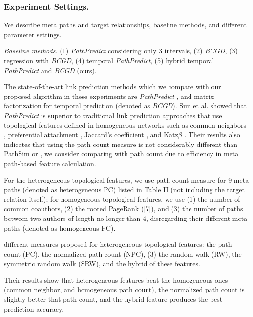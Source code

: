 \subsubsection{Experiment Settings.} We describe meta paths and target relationships, baseline methods, and different parameter settings.

\textit{Baseline methods.} (1) \textit{PathPredict} considering only 3 intervals, (2) \textit{BCGD}, (3) regression with \textit{BCGD}, (4) temporal \textit{PathPredict}, (5) hybrid temporal \textit{PathPredict} and \textit{BCGD} (ours).


The state-of-the-art link prediction methods which we compare with our proposed algorithm in these experiments are \textit{PathPredict} \cite{sun2011ASONAM}, and matrix factorization for temporal prediction \cite{Zhu2016} (denoted as \textit{BCGD}). Sun et al. \cite{sun2011ASONAM} showed that \textit{PathPredict} is superior to traditional link prediction approaches that use topological features defined in homogeneous networks such as common neighbors \cite{newman2001clustering}, preferential attachment \cite{newman2001clustering}, Jaccard's coefficient \cite{liben2007link}, and Katz$\beta$ \cite{katz1953new}. Their results also indicates that using the path count measure is not considerably different than PathSim or , we consider comparing with path count due to efficiency in meta path-based feature calculation.



For the heterogeneous topological features, we use path count measure for 9 meta paths (denoted as heterogeneous PC) listed in Table II (not including the target relation itself); for homogeneous topological features, we use (1) the number of common coauthors, (2) the rooted PageRank ([7]), and (3) the number of paths between two authors of length no longer than 4, disregarding their different meta paths (denoted as homogeneous PC).

different measures proposed for heterogeneous topological features: the path count (PC), the normalized path count (NPC), (3) the random walk (RW), the symmetric random walk (SRW), and the hybrid of these features.

Their results show that heterogeneous features beat the homogeneous ones (common neighbor, and homogeneous path count), the normalized path count is slightly better that path count, and the hybrid feature produces the best prediction accuracy.

